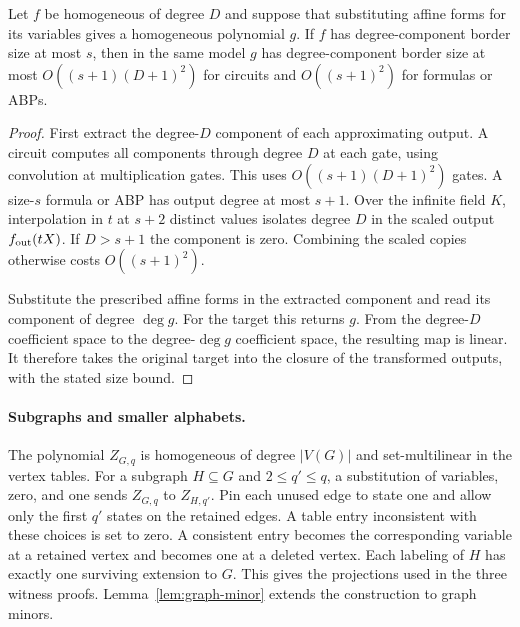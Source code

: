 \begin{lemma}[Projection]\label{lem:projection}
Let \(f\) be homogeneous of degree \(D\) and suppose that substituting
affine forms for its variables gives a homogeneous polynomial \(g\).
If \(f\) has degree-component border size at most \(s\), then in the
same model \(g\) has degree-component border size at most
\(O((s+1)(D+1)^2)\) for circuits and \(O((s+1)^2)\) for formulas or ABPs.
\end{lemma}
\begin{proof}
First extract the degree-\(D\) component of each approximating output.
A circuit computes all components through degree \(D\) at each gate,
using convolution at multiplication gates. This uses
\(O((s+1)(D+1)^2)\) gates. A size-\(s\) formula or ABP has output degree
at most \(s+1\). Over the infinite field \(K\), interpolation in
\(t\) at \(s+2\) distinct values isolates degree \(D\) in the scaled
output \(f_{\rm out}(tX)\). If \(D>s+1\) the component is zero.
Combining the scaled copies otherwise costs \(O((s+1)^2)\).

Substitute the prescribed affine forms in the extracted component
and read its component of degree \(\deg g\). For the target this
returns \(g\). From the degree-\(D\) coefficient space to the
degree-\(\deg g\) coefficient space, the resulting map is linear.
It therefore takes the original target into the closure of the
transformed outputs, with the stated size bound.
\end{proof}

\paragraph{Subgraphs and smaller alphabets.}
The polynomial \(Z_{G,q}\) is homogeneous of degree \(|V(G)|\) and
set-multilinear in the vertex tables. For a subgraph \(H\subseteq G\)
and \(2\le q'\le q\), a substitution of variables, zero, and one sends
\(Z_{G,q}\) to \(Z_{H,q'}\). Pin each unused edge to state one and allow
only the first \(q'\) states on the retained edges. A table entry
inconsistent with these choices is set to zero. A consistent entry
becomes the corresponding variable at a retained vertex and becomes
one at a deleted vertex. Each labeling of \(H\) has exactly one
surviving extension to \(G\). This gives the projections used in the
three witness proofs. Lemma~\ref{lem:graph-minor} extends the construction
to graph minors.
